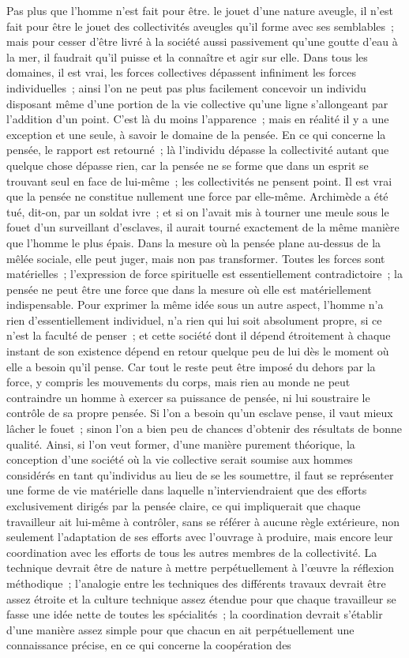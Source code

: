 \documentclass[french,twoside]{book} %
\begin{document}
Pas plus que l'homme n'est fait pour être. le jouet d'une nature aveugle, il n'est fait pour être le jouet des collectivités aveugles qu'il forme avec ses semblables ; mais pour cesser d'être livré à la société aussi passivement qu'une goutte d'eau à la mer, il faudrait qu'il puisse et la connaître et agir sur elle. Dans tous les domaines, il est vrai, les forces collectives dépassent infiniment les forces individuelles ; ainsi l'on ne peut pas plus facilement concevoir un individu disposant même d'une portion de la vie collective qu'une ligne s'allongeant par l'addition d'un point. C'est là du moins l'apparence ; mais en réalité il y a une exception et une seule, à savoir le domaine de la pensée. En ce qui concerne la pensée, le rapport est retourné ; là l'individu dépasse la collectivité autant que quelque chose dépasse rien, car la pensée ne se forme que dans un esprit se trouvant seul en face de lui-même ; les collectivités ne pensent point. Il est vrai que la pensée ne constitue nullement une force par elle-même. Archimède a été tué, dit-on, par un soldat ivre ; et si on l'avait mis à tourner une meule sous le fouet d'un surveillant d'esclaves, il aurait tourné exactement de la même manière que l'homme le plus épais. Dans la mesure où la pensée plane au-dessus de la mêlée sociale, elle peut juger, mais non pas transformer. Toutes les forces sont matérielles ; l'expression de force spirituelle est essentiellement contradictoire ; la pensée ne peut être une force que dans la mesure où elle est matériellement indispensable. Pour exprimer la même idée sous un autre aspect, l'homme n'a rien d'essentiellement individuel, n'a rien qui lui soit absolument propre, si ce n'est la faculté de penser ; et cette société dont il dépend étroitement à chaque instant de son existence dépend en retour quelque peu de lui dès le moment où elle a besoin qu'il pense. Car tout le reste peut être imposé du dehors par la force, y compris les mouvements du corps, mais rien au monde ne peut contraindre un homme à exercer sa puissance de pensée, ni lui soustraire le contrôle de sa propre pensée. Si l'on a besoin qu'un esclave pense, il vaut mieux lâcher le fouet ; sinon l'on a bien peu de chances d'obtenir des résultats de bonne qualité. Ainsi, si l'on veut former, d'une manière purement théorique, la conception d'une société où la vie collective serait soumise aux hommes considérés en tant qu'individus au lieu de se les soumettre, il faut se représenter une forme de vie matérielle dans laquelle n'interviendraient que des efforts exclusivement dirigés par la pensée claire, ce qui impliquerait que chaque travailleur ait lui-même à contrôler, sans se référer à aucune règle extérieure, non seulement l'adaptation de ses efforts avec l'ouvrage à produire, mais encore leur coordination avec les efforts de tous les autres membres de la collectivité. La technique devrait être de nature à mettre perpétuellement à l'œuvre la réflexion méthodique ; l'analogie entre les techniques des différents travaux devrait être assez étroite et la culture technique assez étendue pour que chaque travailleur se fasse une idée nette de toutes les spécialités ; la coordination devrait s'établir d'une manière assez simple pour que chacun en ait perpétuellement une connaissance précise, en ce qui concerne la coopération des 
\end{document}
